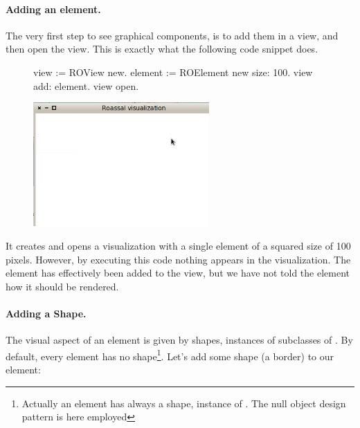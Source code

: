 \documentclass[a4paper,10pt,twoside]{book}
\begin{document}
\paragraph{Adding an element.} The very first step to see graphical components, is to add them in a view, and then open the view. This is exactly what the following code snippet does.

\begin{figure}[H]
      \begin{minipage}[t]{0.5\textwidth}
      \vspace{0pt}
\begin{code}{}
view := ROView new.
element := ROElement new size: 100.
view add: element.
view open.
\end{code}
   \end{minipage}
   \hfill
   \begin{minipage}[t]{0.6\textwidth}
      \vspace{0pt} \raggedright
       \centering
		\includegraphics[width=0.6\textwidth]{ex1}
   \end{minipage}
\label{fig:ex1}
\end{figure}

It creates and opens a visualization with a single element of a squared size of 100 pixels. However, by executing this code nothing appears in the visualization. The element has effectively been added to the view, but we have not told the element how it should be rendered. 

\paragraph{Adding a Shape.} The visual aspect of an element is given by shapes, instances of subclasses of . By default, every element has no shape\footnote{Actually an element has always a shape, instance of . The null object design pattern is here employed}. Let's add some shape (a border) to our element: 
\end{document}
